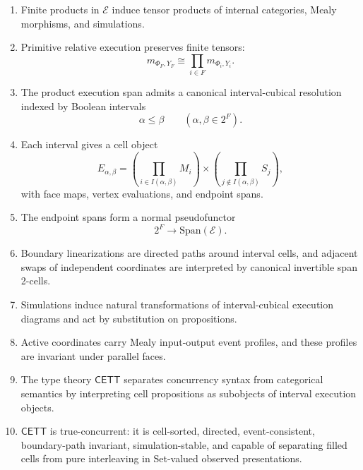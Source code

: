 \begin{enumerate}
    \item Finite products in \(\mathcal E\) induce tensor products of internal
    categories, Mealy morphisms, and simulations.

    \item Primitive relative execution preserves finite tensors:
    \[
        m_{\Phi_F,Y_F}
        \cong
        \prod_{i\in F}m_{\Phi_i,Y_i}.
    \]

    \item The product execution span admits a canonical interval-cubical
    resolution indexed by Boolean intervals
    \[
        \alpha\leq\beta
        \qquad
        (\alpha,\beta\in 2^F).
    \]

    \item Each interval gives a cell object
    \[
        E_{\alpha,\beta}
        =
        \left(\prod_{i\in I(\alpha,\beta)}M_i\right)
        \times
        \left(\prod_{j\notin I(\alpha,\beta)}S_j\right),
    \]
    with face maps, vertex evaluations, and endpoint spans.

    \item The endpoint spans form a normal pseudofunctor
    \[
        2^F\to\mathrm{Span}(\mathcal E).
    \]

    \item Boundary linearizations are directed paths around interval cells,
    and adjacent swaps of independent coordinates are interpreted by
    canonical invertible span 2-cells.

    \item Simulations induce natural transformations of interval-cubical
    execution diagrams and act by substitution on propositions.

    \item Active coordinates carry Mealy input-output event profiles, and
    these profiles are invariant under parallel faces.

    \item The type theory \(\mathsf{CETT}\) separates concurrency syntax from
    categorical semantics by interpreting cell propositions as subobjects of
    interval execution objects.

    \item \(\mathsf{CETT}\) is true-concurrent: it is cell-sorted, directed,
    event-consistent, boundary-path invariant, simulation-stable, and capable
    of separating filled cells from pure interleaving in Set-valued observed
    presentations.


\end{enumerate}
